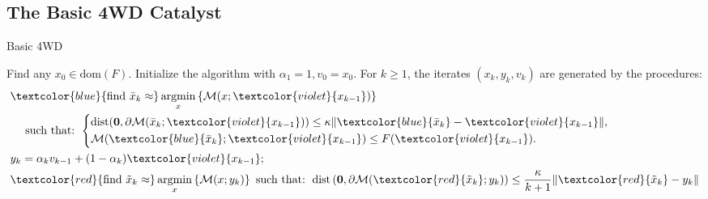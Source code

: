 \documentclass[11pt]{beamer}
\begin{document}
    \subsection{The Basic 4WD Catalyst}
        \begin{frame}{Basic 4WD}
            \begin{definition}
            {\small
                Find any $x_0 \in \text{dom}(F)$. 
                Initialize the algorithm with $\alpha_1 = 1, v_0 = x_0$. 
                For $k \ge 1$, the iterates $(x_k, y_k, v_k)$ are generated by the procedures: 
                \vspace{-0.5em}
                \begin{align*}
                    &
                    \textcolor{blue}{
                        \text{find } \bar x_k \approx 
                    }
                    \argmin_{x}\left\lbrace
                            \mathcal M(x; \textcolor{violet}{x_{k - 1}})
                        \right\rbrace
                    \\ &\quad 
                    \text{ such that:  }
                        \left\lbrace
                            \begin{aligned}
                                & \text{dist}(\mathbf 0, \partial \mathcal M(\bar x_k; \textcolor{violet}{x_{k - 1}})) 
                                \le 
                                \kappa\Vert \textcolor{blue}{\bar x_k}- \textcolor{violet}{x_{k - 1}}\Vert, 
                                \\
                                & \mathcal M(\textcolor{blue}{\bar x_k}; \textcolor{violet}{x_{k - 1}}) 
                                \le F(\textcolor{violet}{x_{k - 1}}). 
                            \end{aligned}
                        \right.
                    \\
                    & y_k = \alpha_k v_{k - 1} + (1 - \alpha_k) \textcolor{violet}{x_{k - 1}};
                    \\
                    & 
                    \textcolor{red}{\text{find }\tilde x_k \approx}
                    \argmin_{x} \left\lbrace
                        \mathcal M(x; y_k) 
                    \right\rbrace
                    \text{ such that: }
                        \dist\left(
                            \mathbf 0, \partial \mathcal M(\textcolor{red}{\tilde x_k}; y_k)
                        \right) 
                        \le \frac{\kappa}{k + 1}\Vert \textcolor{red}{\tilde x_k} - y_k\Vert

\end{align*}}
\end{definition}
\end{frame}
\end{document}
